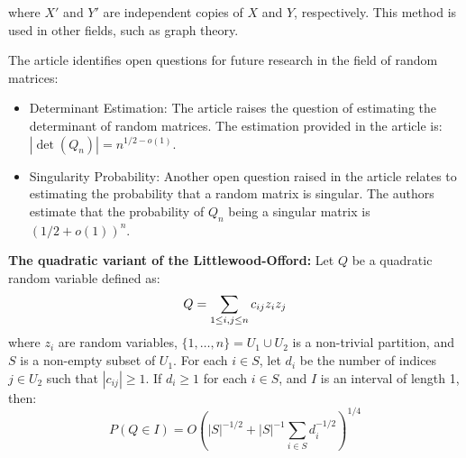 where \(X'\) and \(Y'\) are independent copies of \(X\) and \(Y\), respectively. This method is used in other fields, such as graph theory.

The article identifies open questions for future research in the field of random matrices:

\begin{itemize}
    \item {Determinant Estimation:} The article raises the question of estimating the determinant of random matrices. The estimation provided in the article is: \( |\det(Q_n)| = n^{1/2-o(1)} \).
    \item {Singularity Probability:} Another open question raised in the article relates to estimating the probability that a random matrix is singular. The authors estimate that the probability of \( Q_n \) being a singular matrix is \( (1/2+o(1))^n \).
\end{itemize}

\vspace{\baselineskip}
\textbf{The quadratic variant of the Littlewood-Offord:}
Let \( Q \) be a quadratic random variable defined as:
\vspace{-0.8\baselineskip}
\[ Q = \sum_{1 \leq i,j \leq n} c_{ij} z_i z_j \vspace{-0.5\baselineskip} \]
where \( z_i \) are random variables, \( \{1,\ldots,n\} = U_1 \cup U_2 \) is a non-trivial partition, and \( S \) is a non-empty subset of \( U_1 \). For each \( i \in S \), let \( d_i \) be the number of indices \( j \in U_2 \) such that \( |c_{ij}| \geq 1 \). If \( d_i \geq 1 \) for each \( i \in S \), and \( I \) is an interval of length 1, then:
\vspace{-0.9\baselineskip}
\[ P(Q \in I) = O\left( |S|^{-1/2} + |S|^{-1} \sum_{i \in S} d_i^{-1/2} \right)^{1/4} \]


